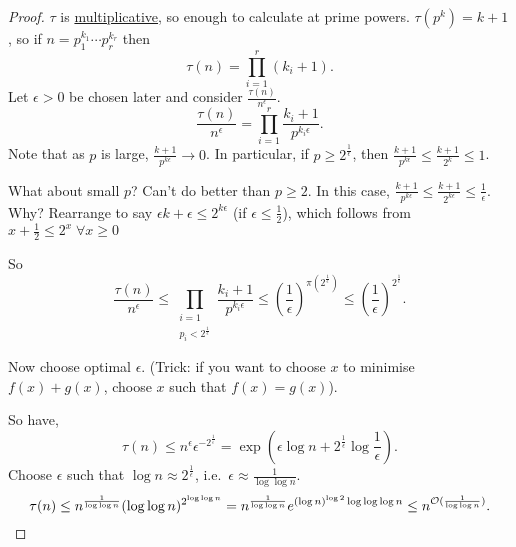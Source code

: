 \documentclass{article}
\newcommand{\1}{\mathbbm{1}}
\newcommand{\bigO}{\mathcal{O}}
\begin{document}
\begin{proof}
  \hyperlink{def:tau}{$\tau$} is \hyperlink{def:multi}{multiplicative}, so enough to calculate at prime powers. $\tau(p^k) = k+1$, so if $n = p_1^{k_1} \dotsm p_r^{k_r}$ then
  \begin{equation*}
    \tau(n) = \prod_{i=1}^r (k_i + 1).
  \end{equation*}
  Let $\epsilon > 0$ be chosen later and consider $\frac{\tau(n)}{n^\epsilon}$.
  \begin{equation*}
    \frac{\tau(n)}{n^\epsilon} = \prod_{i=1}^r \frac{k_i+1}{p^{k_i \epsilon}}.
  \end{equation*}
  Note that as $p$ is large, $\frac{k+1}{p^{k\epsilon}} \to 0$. In particular, if $p \geq 2^{\frac{1}{\epsilon}}$, then $\frac{k+1}{p^{k\epsilon}} \leq \frac{k+1}{2^k} \leq 1$.

  What about small $p$? Can't do better than $p \geq 2$.
  In this case, $\frac{k+1}{p^{k\epsilon}} \leq \frac{k+1}{2^{k\epsilon}} \leq \frac{1}{\epsilon}$.
  Why? Rearrange to say $\epsilon k + \epsilon \leq 2^{k \epsilon}$ (if $\epsilon \leq \frac{1}{2}$), which follows from $x + \frac{1}{2} \leq 2^x \; \forall x \geq 0$

  So
  \begin{equation*}
    \frac{\tau(n)}{n^\epsilon} \leq \prod_{\substack{i=1 \\ p_i < 2^{\frac{1}{\epsilon}}}} \frac{k_i + 1}{p^{k_i \epsilon}} \leq \left(\frac{1}{\epsilon}\right)^{\pi(2^{\frac{1}{\epsilon}})} \leq \left(\frac{1}{\epsilon}\right)^{2^{\frac{1}{\epsilon}}}.
  \end{equation*}

  Now choose optimal $\epsilon$.
  (Trick: if you want to choose $x$ to minimise $f(x) + g(x)$, choose $x$ such that $f(x) = g(x)$).

  So have,
  \begin{equation*}
    \tau(n) \leq n^\epsilon \epsilon^{-2^{\frac{1}{\epsilon}}} = \exp\left(\epsilon \log n + 2^{\frac{1}{\epsilon}} \log \frac{1}{\epsilon}\right).
  \end{equation*}
  Choose $\epsilon$ such that $\log n \approx 2^{\frac{1}{\epsilon}}$, i.e.\ $\epsilon \approx \frac{1}{\log \log n}$.
  \begin{equation*}
    \tau(n) \leq n^{\frac{1}{\log \log n}} (\log \log n)^{2^{\log \log n}} = n^{\frac{1}{\log \log n}} e^{(\log n)^{\log 2} \log \log \log n} \leq n^{\bigO(\frac{1}{\log \log n})}. \qedhere
  \end{equation*}
\end{proof}
\end{document}
